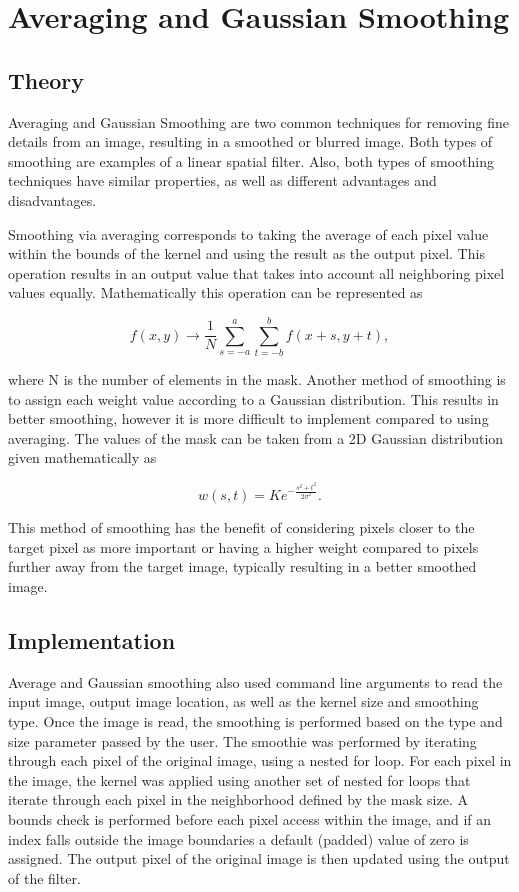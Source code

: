\documentclass[headings=optiontoheadandtoc,listof=totoc,parskip=full]{scrartcl}
\begin{document}
\section{Averaging and Gaussian Smoothing}
\label{sec:smoothing}

\subsection{Theory}

Averaging and Gaussian Smoothing are two common techniques for removing fine details from an image, resulting in a smoothed or blurred image. Both types of smoothing are examples of a linear spatial filter. Also, both types of smoothing techniques have similar properties, as well as different advantages and disadvantages. 

Smoothing via averaging corresponds to taking the average of each pixel value within the bounds of the kernel and using the result as the output pixel. This operation results in an output value that takes into account all neighboring pixel values equally. Mathematically this operation can be represented as

\[f(x, y) \rightarrow \frac{1}{N} \sum_{s=-a}^a \sum_{t=-b}^b f(x+s, y+t),\]

where N is the number of elements in the mask. Another method of smoothing is to assign each weight value according to a Gaussian distribution. This results in better smoothing, however it is more difficult to implement compared to using averaging. The values of the mask can be taken from a 2D Gaussian distribution given mathematically as 

\[w(s, t) = K e^{-\frac{s^2+t^2}{2\sigma^2}}.\]

This method of smoothing has the benefit of considering pixels closer to the target pixel as more important or having a higher weight compared to pixels further away from the target image, typically resulting in a better smoothed image.


\subsection{Implementation}

Average and Gaussian smoothing also used command line arguments to read the input image, output image location, as well as the kernel size and smoothing type. Once the image is read, the smoothing is performed based on the type and size parameter passed by the user. The smoothie was performed by iterating through each pixel of the original image, using a nested for loop. For each pixel in the image, the kernel was applied using another set of nested for loops that iterate through each pixel in the neighborhood defined by the mask size. A bounds check is performed before each pixel access within the image, and if an index falls outside the image boundaries a default (padded) value of zero is assigned. The output pixel of the original image is then updated using the output of the filter.
\end{document}
